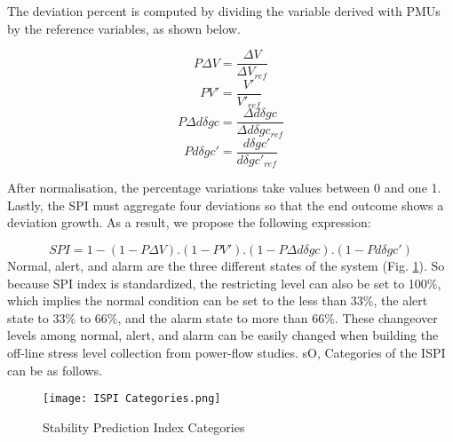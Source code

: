 The deviation percent is computed by dividing the variable derived with PMUs by the reference variables, as shown below.

\begin{equation}
    P\Delta V = \frac{\Delta V}{\Delta V_{ref}}
\end{equation}
\begin{equation}
    PV' = \frac{V'}{V'_{ref}}
\end{equation}
\begin{equation}
    P\Delta d \delta gc = \frac{\Delta d \delta gc}{\Delta d \delta gc_{ref}}
\end{equation}
\begin{equation}
    Pd \delta gc' = \frac{ d \delta gc'}{ d \delta gc'_{ref}}
\end{equation}

After normalisation, the percentage variations take values between 0 and one 1. Lastly, the SPI must aggregate four deviations so that the end outcome shows a deviation growth. As a result, we propose the following expression:

\begin{equation}
    SPI = 1-(1-P\Delta V).(1-PV').(1-P\Delta d \delta gc).(1-Pd \delta gc') \label{IL}
\end{equation}
Normal, alert, and alarm are the three different states of the system (Fig. \ref{ISPI Categories}). So because SPI index is standardized, the restricting level can also be set to 100\%, which implies the normal condition can be set to the less than 33\%, the alert state to 33\% to 66\%, and the alarm state to more than 66\%. These changeover levels among normal, alert, and alarm can be easily changed when building the off-line stress level collection from power-flow studies. sO, Categories of the ISPI can be as follows.

\begin{figure}[H]
	 \centering
	\texttt{[image: ISPI Categories.png]}
	\caption{Stability Prediction Index Categories}
	\label{ISPI Categories}
	\end{figure}

